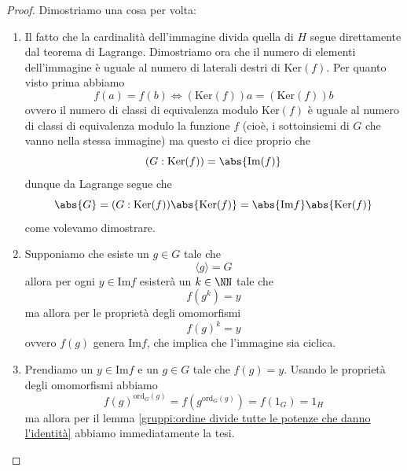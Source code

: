\documentclass[11pt]{scrartcl}
\renewcommand{\ker}[1]{\text{Ker}\!\left(#1\right)}
\newcommand{\ordine}[2]{\text{ord}_{#1}\left(#2\right)}
\begin{document}
	\begin{proof}
		Dimostriamo una cosa per volta:
		\begin{enumerate}
			\item Il fatto che la cardinalità dell'immagine divida quella di $H$ segue direttamente dal teorema di Lagrange. Dimostriamo ora che il numero di elementi dell'immagine è uguale al numero di laterali destri di $\ker{f}$. Per quanto visto prima abbiamo
			$$f(a)=f(b) \iff (\ker {f})a=(\ker{f})b$$
			ovvero il numero di classi di equivalenza modulo $\ker{f}$ è uguale al numero di classi di equivalenza modulo la funzione $f$ (cioè, i sottoinsiemi di $G$ che vanno nella stessa immagine) ma questo ci dice proprio che
			$$(G:\ker{f})=\abs{\text{Im}(f)}$$
			dunque da Lagrange segue che 
			$$\abs{G}=(G:\ker{f})\abs{\ker{f}}=\abs{\text{Im}f}\abs{\ker{f}}$$
			come volevamo dimostrare.
			\item Supponiamo che esiste un $g\in G$ tale che 
			$$\langle g \rangle = G$$
			allora per ogni $y\in \text{Im}f$ esisterà un $k\in\NN$ tale che 
			$$f(g^k)=y$$
			ma allora per le proprietà degli omomorfismi
			$$f(g)^k=y$$
			ovvero $f(g)$ genera $\text{Im}f$, che implica che l'immagine sia ciclica.
			\item Prendiamo un $y\in \text{Im}f$ e un $g\in G$ tale che $f(g)=y$. Usando le proprietà degli omomorfismi abbiamo
			$$f(g)^{\ordine{G}{g}}=f\left(g^{\ordine{G}{g}}\right)=f(1_G)=1_H$$
			ma allora per il lemma \ref{gruppi:ordine divide tutte le potenze che danno l'identità} abbiamo immediatamente la tesi.
		\end{enumerate}
	\end{proof}
	
\end{document}
